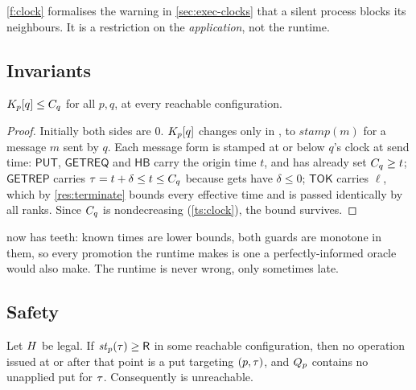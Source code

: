 \ref{f:clock} formalises the warning in \cref{sec:exec-clocks} that a silent
process blocks its neighbours. It is a restriction on the \emph{application},
not the runtime.

\subsection{Invariants}
\label{sec:l1-invariants}

\begin{invariant}\label{inv:l1-clock}
$K_{p}[q] \le C_{q}$ for all $p,q$, at every reachable configuration.
\end{invariant}

\begin{proof}
Initially both sides are $0$. $K_{p}[q]$ changes only in , to
$\mathit{stamp}(m)$ for a message $m$ sent by $q$. Each message form is
stamped at or below $q$'s clock at send time: $\mathsf{PUT}$, $\mathsf{GETREQ}$
and $\mathsf{HB}$ carry the origin time $t$, and  has already set
$C_{q} \ge t$; $\mathsf{GETREP}$ carries $\tau = t + \delta \le t \le C_{q}$
because \glspl{get} have $\delta \le 0$; $\mathsf{TOK}$ carries $\ell$, which by
\cref{res:terminate} bounds every effective time and is passed identically by
all \glspl{rank}. Since $C_{q}$ is nondecreasing (\cref{ts:clock}), the bound
survives.
\end{proof}

 now has teeth: known times are lower bounds, both
guards are monotone in them, so every promotion the runtime makes is one a
perfectly-informed oracle would also make. The runtime is never wrong, only
sometimes late.

\subsection{Safety}
\label{sec:l1-safety}

\begin{theorem}\label{thm:write-closure}
Let $H$ be legal. If $\mathit{st}_{p}(\tau) \ge \mathsf{R}$ in some reachable
configuration, then no operation issued at or after that point is a \gls{put}
targeting $(p, \tau)$, and $Q_{p}$ contains no unapplied put for $\tau$.
Consequently  is unreachable.
\end{theorem}

